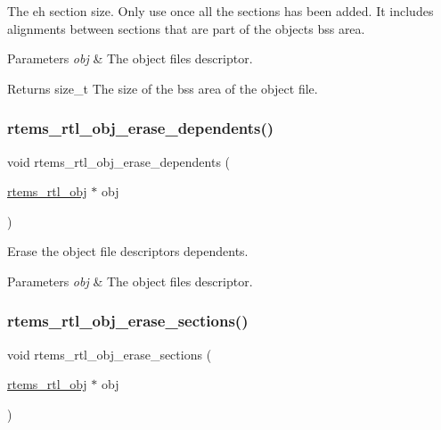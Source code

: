 The eh section size. Only use once all the sections has been added. It includes alignments between sections that are part of the object\textquotesingle{}s bss area.


\begin{DoxyParams}{Parameters}
{\em obj} & The object file\textquotesingle{}s descriptor. \\
\hline
\end{DoxyParams}
\begin{DoxyReturn}{Returns}
size\+\_\+t The size of the bss area of the object file. 
\end{DoxyReturn}
\mbox{\label{rtl-obj_8h_aea8861e811c36196e95b439e33707484}} 
\subsubsection{\texorpdfstring{rtems\_rtl\_obj\_erase\_dependents()}{rtems\_rtl\_obj\_erase\_dependents()}}
{\footnotesize\ttfamily void rtems\+\_\+rtl\+\_\+obj\+\_\+erase\+\_\+dependents (\begin{DoxyParamCaption}\item[{\mbox{\hyperlink{structrtems__rtl__obj}{rtems\+\_\+rtl\+\_\+obj}} $\ast$}]{obj }\end{DoxyParamCaption})}

Erase the object file descriptor\textquotesingle{}s dependents.


\begin{DoxyParams}{Parameters}
{\em obj} & The object file\textquotesingle{}s descriptor. \\
\hline
\end{DoxyParams}
\mbox{\label{rtl-obj_8h_a35b64d2ab1e6c8fa1a82dfa0a14ea1e0}} 
\subsubsection{\texorpdfstring{rtems\_rtl\_obj\_erase\_sections()}{rtems\_rtl\_obj\_erase\_sections()}}
{\footnotesize\ttfamily void rtems\+\_\+rtl\+\_\+obj\+\_\+erase\+\_\+sections (\begin{DoxyParamCaption}\item[{\mbox{\hyperlink{structrtems__rtl__obj}{rtems\+\_\+rtl\+\_\+obj}} $\ast$}]{obj }\end{DoxyParamCaption})}

